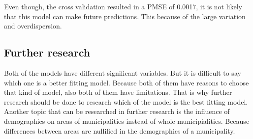\documentclass[11pt,]{article}
\begin{document}
Even though, the cross validation resulted in a PMSE of 0.0017, it is
not likely that this model can make future predictions. This because of
the large variation and overdispersion.

\subsection{Further research}\label{further-research}

Both of the models have different significant variables. But it is
difficult to say which one is a better fitting model. Because both of
them have reasons to choose that kind of model, also both of them have
limitations. That is why further research should be done to research
which of the model is the best fitting model. Another topic that can be
researched in further research is the influence of demographics on areas
of municipalities instead of whole municipialities. Because differences
between areas are nullified in the demographics of a municipality.
\end{document}
